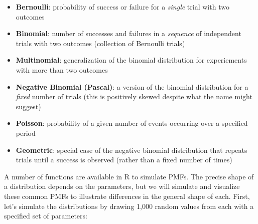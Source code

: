 \documentclass[]{book}
\providecommand{\tightlist}{%
  \setlength{\itemsep}{0pt}\setlength{\parskip}{0pt}}
\begin{document}
\begin{itemize}
\tightlist
\item
  \textbf{Bernoulli}: probability of success or failure for a \emph{single} trial with two outcomes
\item
  \textbf{Binomial}: number of successes and failures in a \emph{sequence} of independent trials with two outcomes (collection of Bernoulli trials)
\item
  \textbf{Multinomial}: generalization of the binomial distribution for experiements with more than two outcomes
\item
  \textbf{Negative Binomial (Pascal)}: a version of the binomial distribution for a \emph{fixed} number of trials (this is positively skewed despite what the name might suggest)
\item
  \textbf{Poisson}: probability of a given number of events occurring over a specified period
\item
  \textbf{Geometric}: special case of the negative binomial distribution that repeats trials until a success is observed (rather than a fixed number of times)
\end{itemize}

A number of functions are available in R to simulate PMFs. The precise shape of a distribution depends on the parameters, but we will simulate and visualize these common PMFs to illustrate differences in the general shape of each. First, let's simulate the distributions by drawing 1,000 random values from each with a specified set of parameters:
\end{document}
